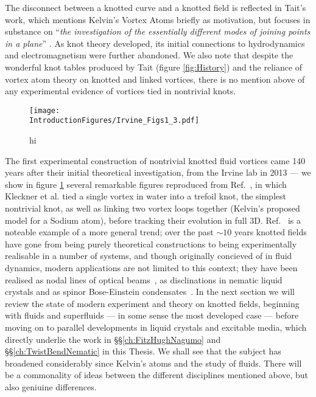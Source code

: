 The disconnect between a knotted curve and a knotted field is reflected in Tait's work, which mentions Kelvin's Vortex Atoms briefly as motivation, but focuses in substance on ``\emph{the investigation of the essentially different modes of joining points in a plane}'' \citep{Tait1}. As knot theory developed, its initial connections to hydrodynamics and electromagnetism were further abandoned. We also note that despite the wonderful knot tables produced by Tait (figure \ref{fig:History}) and the reliance of vortex atom theory on knotted and linked vortices, there is no mention above of any experimental evidence of vortices tied in nontrivial knots. 
\begin{figure}[htbp]
\centering
\texttt{[image: \\IntroductionFigures/Irvine\_Figs1\_3.pdf]}
\caption{hi }
\label{fig:Irvine}
\end{figure}

The first experimental construction of nontrivial knotted fluid vortices came 140 years after their initial theoretical investigation, from the Irvine lab in 2013 --- we show in figure \ref{fig:Irvine} several remarkable figures reproduced from Ref.~\citep{Kleckner2013}, in which Kleckner et al. tied a single vortex in water into a trefoil knot, the simplest nontrivial knot, as well as linking two vortex loops together (Kelvin's proposed model for a Sodium atom), before tracking their evolution in full 3D. Ref.~\citep{Kleckner2013} is a noteable example of a more general trend; over the past $\sim10$ years knotted fields have gone from being purely theoretical constructions to being experimentally realisable in a number of systems, and though originally concieved of in fluid dynamics, modern applications are not limited to this context; they have been realised as nodal lines of optical beams~\citep{Dennis2010}, as disclinations in nematic liquid crystals and as spinor Bose-Einstein condensates~\citep{Tkalec2011,Tasinkevych2014,Copar2015}. In the next section we will review the state of modern experiment and theory on knotted fields, beginning with fluids and superfluids --- in some sense the most developed case --- before moving on to parallel developments in liquid crystals and excitable media, which directly underlie the work in \S\S \ref{ch:FitzHughNagumo} and \S\S \ref{ch:TwistBendNematic} in this Thesis. We shall see that the subject has broadened considerably since Kelvin's atoms and the study of fluids. There will be a commonality of ideas between the different disciplines mentioned above, but also geniuine differences.

